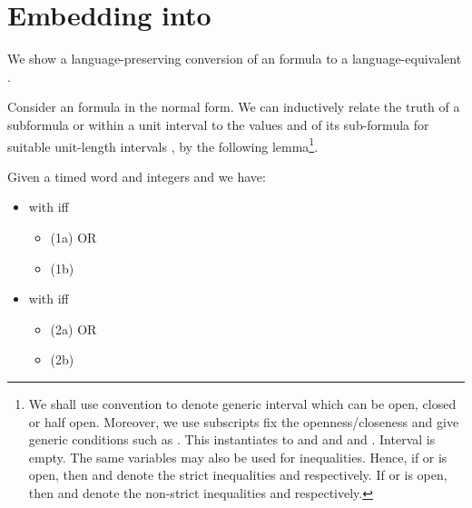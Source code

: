 \documentclass{llncs}
\newcommand{\bmitlfp}{\mbox{}}
\newcommand{\potdta}{\mbox{}}
\newcommand{\mitlfpb}{\bmitlfp}
\begin{document}
\section{Embedding \mitlfpb\/ into \potdta}
We show a language-preserving conversion of an \mitlfpb\/ formula to a language-equivalent \potdta. 


Consider an \mitlfpb\/ formula  in the normal form.
We can inductively relate the truth of a subformula  or
 within a unit interval  to the values  
and  of its sub-formula  for suitable unit-length intervals 
, by the following lemma\footnote{ We
shall use convention  to denote generic interval which can be open, closed or half open. Moreover, we use subscripts  fix the openness/closeness and give generic conditions such as . This instantiates to  and  and  and . Interval  is empty. The same variables may also be used for inequalities. Hence, if  or  is open, then  and  denote the strict inequalities  and  respectively. If  or  is open, then  and  denote the non-strict inequalities  and  respectively.}. 
\begin{lemma} 
\label{lem:embedtwo}
Given a timed word  and integers  and  we have:
\begin{itemize}
\item  with  iff
\begin{itemize}
\item (1a)  OR 
\item (1b)  \\
\end{itemize}
\item  with  iff
\begin{itemize} 
\item (2a)  OR
\item (2b)  
\end{itemize}
\end{itemize}
\end{lemma}
\end{document}
